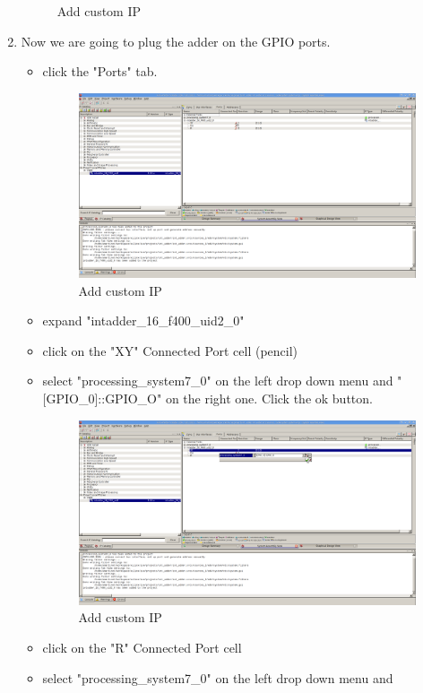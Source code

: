 \documentclass{article}
\begin{document}
\begin{enumerate}
\begin{figure}
	\caption{Add custom IP}
	\end{figure}
	\item Now we are going to plug the adder on the GPIO ports.
	\begin{itemize}
		\item click the "Ports" tab.
	\begin{figure}
	\includegraphics[scale=0.25]{pictures/AddPeripheral4.png}
	\caption{Add custom IP}
	\end{figure}
		\item expand "intadder\_16\_f400\_uid2\_0"
		\item click on the "XY" Connected Port cell (pencil)
		\item select "processing\_system7\_0" on the left drop down menu and
		"[GPIO\_0]::GPIO\_O" on the right one. Click the ok button.
	\begin{figure}
	\includegraphics[scale=0.25]{pictures/AddPeripheral5.png}
	\caption{Add custom IP}
	\end{figure}
		\item click on the "R" Connected Port cell
		\item select "processing\_system7\_0" on the left drop down menu and

\end{itemize}
\end{enumerate}
\end{document}
